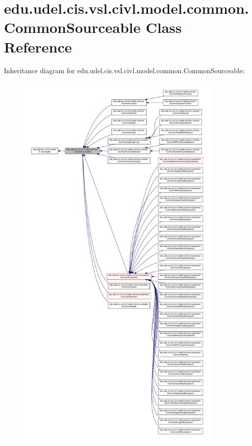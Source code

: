 \hypertarget{classedu_1_1udel_1_1cis_1_1vsl_1_1civl_1_1model_1_1common_1_1CommonSourceable}{}\section{edu.\+udel.\+cis.\+vsl.\+civl.\+model.\+common.\+Common\+Sourceable Class Reference}
\label{classedu_1_1udel_1_1cis_1_1vsl_1_1civl_1_1model_1_1common_1_1CommonSourceable}


Inheritance diagram for edu.\+udel.\+cis.\+vsl.\+civl.\+model.\+common.\+Common\+Sourceable\+:
\nopagebreak
\begin{figure}[H]
\begin{center}
\leavevmode
\includegraphics[height=550pt]{classedu_1_1udel_1_1cis_1_1vsl_1_1civl_1_1model_1_1common_1_1CommonSourceable__inherit__graph}
\end{center}
\end{figure}


